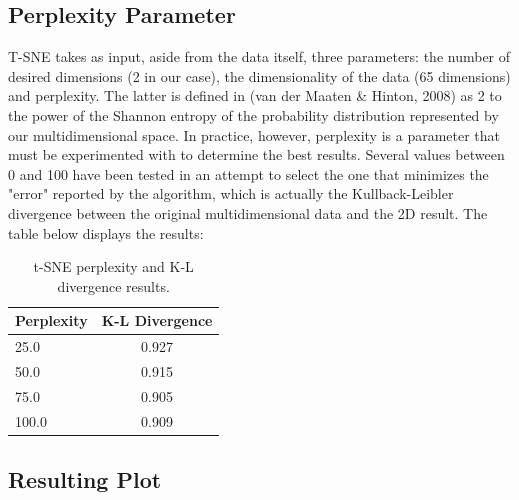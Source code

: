 \documentclass{bigdata}
\begin{document}
\subsection{Perplexity Parameter}
T-SNE takes as input, aside from the data itself, three parameters: the number of desired dimensions (2 in our case), the dimensionality of the data (65 dimensions) and perplexity. The latter is defined in (van der Maaten \& Hinton, 2008) as 2 to the power of the Shannon entropy of the probability distribution represented by our multidimensional space. In practice, however, perplexity is a parameter that must be experimented with to determine the best results. \newline
Several values between 0 and 100 have been tested in an attempt to select the one that minimizes the "error" reported by the algorithm, which is actually the Kullback-Leibler divergence between the original multidimensional data and the 2D result. The table below displays the results:

\begin{table}[h!]
	\begin{center}
		\begin{tabular}{l|c} %
			\textbf{Perplexity} & \textbf{K-L Divergence}\\
			\hline
			25.0 & 0.927\\
			50.0 & 0.915\\
			75.0 & 0.905\\
			100.0& 0.909
		\end{tabular}
	\end{center}
\caption{t-SNE perplexity and K-L divergence results.}
\label{Table 3,}
\end{table}

\subsection{Resulting Plot}
\end{document}
